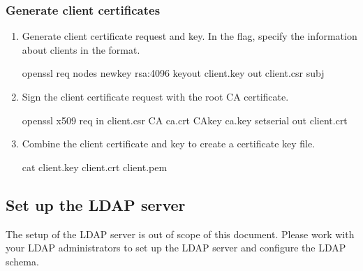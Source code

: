 \documentclass[letterpaper,10pt,english]{sphinxmanual}
\begin{document}
\subsubsection{Generate client certificates}
\label{\detokenize{x509-ldap:generate-client-certificates}}\begin{enumerate}
%
\item {} 
\sphinxAtStartPar
Generate client certificate request and key. In the  flag, specify the information about clients in the  format.

\begin{sphinxVerbatim}[commandchars=\\\{\}]
\PYGZdl{} openssl req \PYGZhy{}nodes \PYGZhy{}newkey rsa:4096 \PYGZhy{}keyout client.key \PYGZhy{}out client.csr \PYGZhy{}subj 
\end{sphinxVerbatim}

\item {} 
\sphinxAtStartPar
Sign the client certificate request with the root CA certificate.

\begin{sphinxVerbatim}[commandchars=\\\{\}]
\PYGZdl{} openssl x509 \PYGZhy{}req \PYGZhy{}in client.csr \PYGZhy{}CA ca.crt \PYGZhy{}CAkey ca.key \PYGZhy{}set\PYGZus{}serial  \PYGZhy{}out client.crt
\end{sphinxVerbatim}

\item {} 
\sphinxAtStartPar
Combine the client certificate and key to create a certificate key file.

\begin{sphinxVerbatim}[commandchars=\\\{\}]
\PYGZdl{} cat client.key client.crt \PYGZgt{} client.pem
\end{sphinxVerbatim}

\end{enumerate}


\subsection{Set up the LDAP server}
\label{\detokenize{x509-ldap:set-up-the-ldap-server}}
\sphinxAtStartPar
The setup of the LDAP server is out of scope of this document. Please work with your LDAP administrators to set up the LDAP server and configure the LDAP schema.
\end{document}
